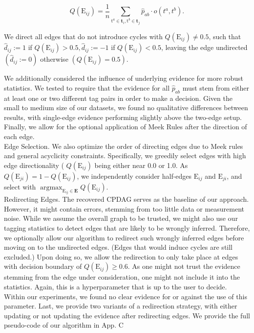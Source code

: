 \documentclass[10pt]{article}
\begin{document}
\begin{equation*}
Q\left(\mathrm{E}_{i j}\right)=\frac{1}{n} \sum_{\mathrm{t}^{a} \in \mathbf{t}_{i}, \mathrm{t}^{b} \in \mathbf{t}_{j}} \hat{p}_{a b} \cdot o\left(t^{a}, t^{b}\right) . \tag{5}
\end{equation*}


We direct all edges that do not introduce cycles with $Q\left(\mathrm{E}_{i j}\right) \neq 0.5$, such that $\hat{d}_{i j}:=1$ if $Q\left(\mathrm{E}_{i j}\right)> 0.5, \hat{d}_{i j}:=-1$ if $Q\left(\mathrm{E}_{i j}\right)<0.5$, leaving the edge undirected $\left(\hat{d}_{i j}:=0\right)$ otherwise $\left(Q\left(\mathrm{E}_{i j}\right)=0.5\right)$.

We additionally considered the influence of underlying evidence for more robust statistics. We tested to require that the evidence for all $\hat{p}_{a b}$ must stem from either at least one or two different tag pairs in order to make a decision. Given the small to medium size of our datasets, we found no qualitative differences between results, with single-edge evidence performing slightly above the two-edge setup. Finally, we allow for the optional application of Meek Rules after the direction of each edge.\\
Edge Selection. We also optimize the order of directing edges due to Meek rules and general acyclicity constraints. Specifically, we greedily select edges with high edge directionality ( $Q\left(\mathrm{E}_{i j}\right)$ being either near 0.0 or 1.0. As $Q\left(\mathrm{E}_{j i}\right)=1-Q\left(\mathrm{E}_{i j}\right)$, we independently consider half-edges $\mathrm{E}_{i j}$ and $\mathrm{E}_{j i}$, and select with $\operatorname{argmax}_{\mathrm{E}_{i j} \in \mathbf{E}} Q\left(\mathrm{E}_{i j}\right)$.\\
Redirecting Edges. The recovered CPDAG serves as the baseline of our approach. However, it might contain errors, stemming from too little data or measurement noise. While we assume the overall graph to be trusted, we might also use our tagging statistics to detect edges that are likely to be wrongly inferred. Therefore, we optionally allow our algorithm to redirect such wrongly inferred edges before moving on to the undirected edges. (Edges that would induce cycles are still excluded.) Upon doing so, we allow the redirection to only take place at edges with decision boundary of $Q\left(\mathrm{E}_{i j}\right) \geq 0.6$. As one might not trust the evidence stemming from the edge under consideration, one might not include it into the statistics. Again, this is a hyperparameter that is up to the user to decide. Within our experiments, we found no clear evidence for or against the use of this parameter. Last, we provide two variants of a redirection strategy, with either updating or not updating the evidence after redirecting edges. We provide the full pseudo-code of our algorithm in App. C
\end{document}
